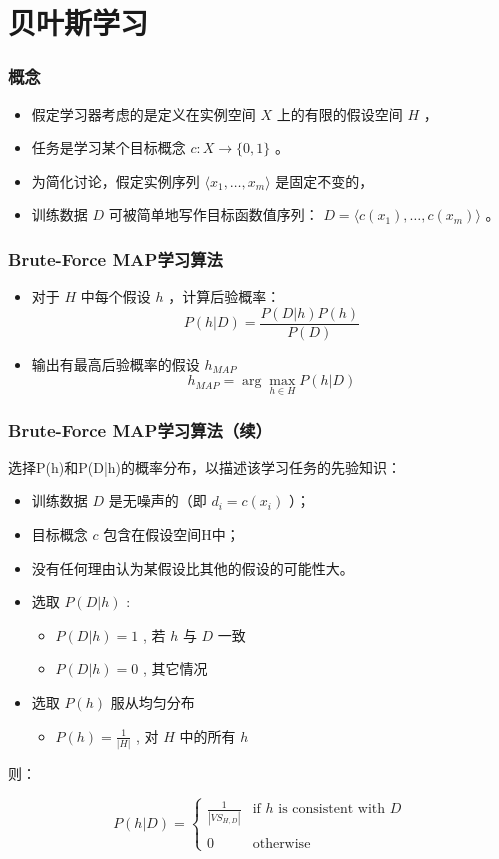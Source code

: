 \documentclass{beamer}
\begin{document}
\section{贝叶斯学习}
\label{sec-2}
\begin{frame}
\frametitle{概念}
\label{sec-2-1}

\begin{itemize}
\item 假定学习器考虑的是定义在实例空间 $X$ 上的有限的假设空间 $H$ ，
\item 任务是学习某个目标概念 $c:X\rightarrow \{0,1\}$ 。
\item 为简化讨论，假定实例序列 $\langle x_{1}, \ldots, x_{m}\rangle$ 是固定不变的，
\item 训练数据 $D$ 可被简单地写作目标函数值序列： $D = \langle c(x_{1}),\ldots, c(x_{m})\rangle$  。
\end{itemize}
\end{frame}
\begin{frame}
\frametitle{Brute-Force MAP学习算法}
\label{sec-2-2}

\begin{itemize}
\item 对于 $H$ 中每个假设 $h$ ，计算后验概率：
  $$P(h|D) = \frac{P(D|h) P(h)}{P(D)}$$
\item 输出有最高后验概率的假设 $h_{MAP}$ 
  $$h_{MAP} = \arg \max_{h \in H} P(h|D)$$
\end{itemize}
\end{frame}
\begin{frame}
\frametitle{Brute-Force MAP学习算法（续）}
\label{sec-2-3}

选择P(h)和P(D|h)的概率分布，以描述该学习任务的先验知识：
\begin{itemize}
\item 训练数据 $D$ 是无噪声的（即 $d_i=c(x_i)$ ）；
\item 目标概念 $c$ 包含在假设空间H中；
\item 没有任何理由认为某假设比其他的假设的可能性大。
\item 选取 $P(D|h)$ :
\begin{itemize}
\item $P(D|h)=1$ , 若 $h$ 与 $D$ 一致
\item $P(D|h)=0$ , 其它情况
\end{itemize}
\item 选取 $P(h)$ 服从均匀分布
\begin{itemize}
\item $P(h) = \frac{1}{|H|}$ , 对 $H$ 中的所有 $h$
\end{itemize}
\end{itemize}

则：

\begin{equation*}
P(h|D) = \left\{ \begin{array}{cl}
  \frac{1}{|VS_{H,D}|} & \mbox{if $h$ is consistent with $D$} \\
\\
  0  & \mbox{otherwise} 
\end{array} \right.
\end{equation*}
\end{frame}
\end{document}
